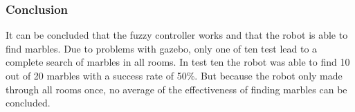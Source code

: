 \documentclass[../Head/Main.tex]{subfiles}
\begin{document}





\subsubsection*{Conclusion}

It can be concluded that the fuzzy controller works and that the robot is able to find marbles. Due to problems with gazebo, only one of ten test lead to a complete search of marbles in all rooms. In test ten the robot was able to find 10 out of 20 marbles with a success rate of 50\%. But because the robot only made through all rooms once, no average of the effectiveness of finding marbles can be concluded.     
\end{document}
